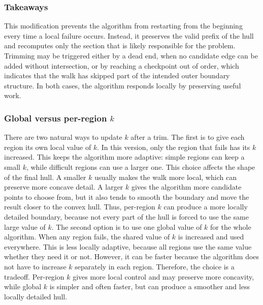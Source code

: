 \documentclass[10pt,twocolumn]{article}
\begin{document}
\subsubsection*{Takeaways}
This modification prevents the algorithm from restarting from the beginning every time a local failure occurs. Instead, it preserves the valid prefix of the hull and recomputes only the section that is likely responsible for the problem. Trimming may be triggered either by a dead end, when no candidate edge can be added without intersection, or by reaching a checkpoint out of order, which indicates that the walk has skipped part of the intended outer boundary structure. In both cases, the algorithm responds locally by preserving useful work.
\subsubsection*{Global versus per-region $k$}
There are two natural ways to update $k$ after a trim. The first is to give each
region its own local value of $k$. In this version, only the region that fails has
its $k$ increased. This keeps the algorithm more adaptive: simple regions can keep
a small $k$, while difficult regions can use a larger one.
This choice affects the shape of the final hull. A smaller $k$ usually makes the
walk more local, which can preserve more concave detail. A larger $k$ gives the
algorithm more candidate points to choose from, but it also tends to smooth the
boundary and move the result closer to the convex hull. Thus, per-region $k$ can
produce a more locally detailed boundary, because not every part of the hull is forced
to use the same large value of $k$.
The second option is to use one global value of $k$ for the whole algorithm. When
any region fails, the shared value of $k$ is increased and used everywhere. This is
less locally adaptive, because all regions use the same value whether they need it or
not. However, it can be faster because the algorithm does not have to increase $k$
separately in each region.
Therefore, the choice is a tradeoff. Per-region $k$ gives more local control and may
preserve more concavity, while global $k$ is simpler and often faster, but can
produce a smoother and less locally detailed hull.
\end{document}
